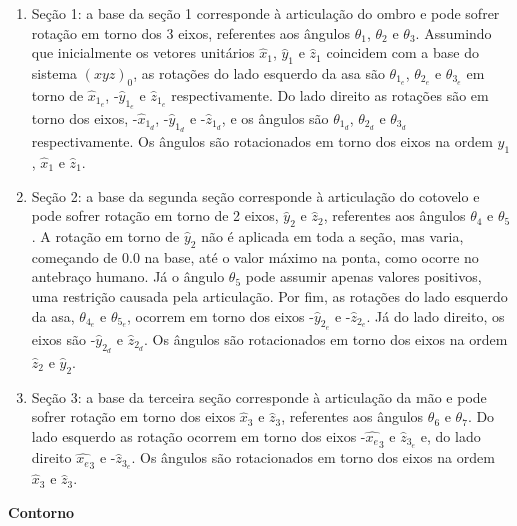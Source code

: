 \documentclass[10pt,a4paper]{report}
\begin{document}
\begin{enumerate}
	
	\item Seção 1: a base da seção 1 corresponde à articulação do ombro e pode sofrer rotação em torno dos 3 eixos, referentes aos ângulos {$\theta_{1}$}, {$\theta_{2}$} e {$\theta_{3}$}. Assumindo que inicialmente os vetores unitários {$\hat{x}_{1}$}, {$\hat{y}_{1}$} e {$\hat{z}_{1}$} coincidem com a base do sistema {$(xyz)_{0}$}, as rotações do lado esquerdo da asa são {$\theta_{1_{e}}$}, {$\theta_{2_{e}}$} e {$\theta_{3_{e}}$} em torno de {$\hat{x}_{1_{e}}$}, -{$\hat{y}_{1_{e}}$} e {$\hat{z}_{1_{e}}$} respectivamente. Do lado direito as rotações são em torno dos eixos, -{$\hat{x}_{1_{d}}$}, -{$\hat{y}_{1_{d}}$} e -{$\hat{z}_{1_{d}}$}, e os ângulos são {$\theta_{1_{d}}$}, {$\theta_{2_{d}}$} e {$\theta_{3_{d}}$} respectivamente. Os ângulos são rotacionados em torno dos eixos na ordem {$\hat{y}_{1}$}, {$\hat{x}_{1}$} e {$\hat{z}_{1}$}.
	
	\item Seção 2: a base da segunda seção corresponde à articulação do cotovelo e pode sofrer rotação em torno de 2 eixos, {$\hat{y}_{2}$} e {$\hat{z}_{2}$}, referentes aos ângulos {$\theta_{4}$} e {$\theta_{5}$}. A rotação em torno de {$\hat{y}_{2}$} não é aplicada em toda a seção, mas varia, começando de {$0.0$} na base, até o valor máximo na ponta, como ocorre no antebraço humano. Já o ângulo {$\theta_{5}$} pode assumir apenas valores positivos, uma restrição causada pela articulação. Por fim, as rotações do lado esquerdo da asa, {$\theta_{4_{e}}$} e {$\theta_{5_{e}}$}, ocorrem em torno dos eixos -{$\hat{y}_{2_{e}}$} e -{$\hat{z}_{2_{e}}$}. Já do lado direito, os eixos são -{$\hat{y}_{2_{d}}$} e {$\hat{z}_{2_{d}}$}. Os ângulos são rotacionados em torno dos eixos na ordem {$\hat{z}_{2}$} e {$\hat{y}_{2}$}.
	
	\item Seção 3: a base da terceira seção corresponde à articulação da mão e pode sofrer rotação em torno dos eixos {$\hat{x}_{3}$} e {$\hat{z}_{3}$}, referentes aos ângulos {$\theta_{6}$} e {$\theta_{7}$}. Do lado esquerdo as rotação ocorrem em torno dos eixos -{$\hat{x_{e}}_{3}$} e {$\hat{z}_{3_{e}}$} e, do lado direito {$\hat{x_{e}}_{3}$} e -{$\hat{z}_{3_{e}}$}. Os ângulos são rotacionados em torno dos eixos na ordem {$\hat{x}_{3}$} e {$\hat{z}_{3}$}.
	
\end{enumerate}

\textbf{Contorno}
\end{document}
